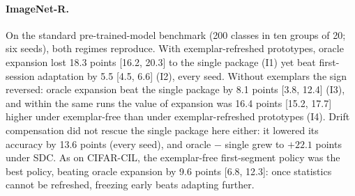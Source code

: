 \documentclass[10pt]{article}
\begin{document}
\paragraph{ImageNet-R.} On the standard pre-trained-model benchmark (200 classes in ten groups of 20; six seeds), both regimes reproduce. With exemplar-refreshed prototypes, oracle expansion lost 18.3 points [16.2, 20.3] to the single package (I1) yet beat first-session adaptation by 5.5 [4.5, 6.6] (I2), every seed. Without exemplars the sign reversed: oracle expansion beat the single package by 8.1 points [3.8, 12.4] (I3), and within the same runs the value of expansion was 16.4 points [15.2, 17.7] higher under exemplar-free than under exemplar-refreshed prototypes (I4). Drift compensation did not rescue the single package here either: it lowered its accuracy by 13.6 points (every seed), and oracle $-$ single grew to $+22.1$ points under SDC. As on CIFAR-CIL, the exemplar-free first-segment policy was the best policy, beating oracle expansion by 9.6 points [6.8, 12.3]: once statistics cannot be refreshed, freezing early beats adapting further.
\end{document}
